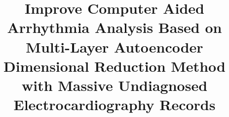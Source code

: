 \documentclass{bmcart}
\begin{document}
\begin{frontmatter}

\begin{fmbox}


\title{Improve Computer Aided Arrhythmia Analysis Based on Multi-Layer Autoencoder Dimensional Reduction Method with Massive Undiagnosed Electrocardiography Records}


\author[
   addressref={aff1, aff2},                   %
   email={yan.yan@siat.ac.cn}   %
]{\inits{} }
\author[
   addressref={aff1,aff2},
    noteref={n1},
   email={kamen@siat.ac.cn}
]{\inits{} }
\author[
   addressref={aff1},
      corref={aff1},                       %
   email={wang.lei@siat.ac.cn}
]{\inits{} }

\address[id=aff1]{%
  , %
  ,                     %
  ,                              %
}
\address[id=aff2]{%
  ,
  ,
  ,
}


\end{fmbox}
\end{frontmatter}
\end{document}
